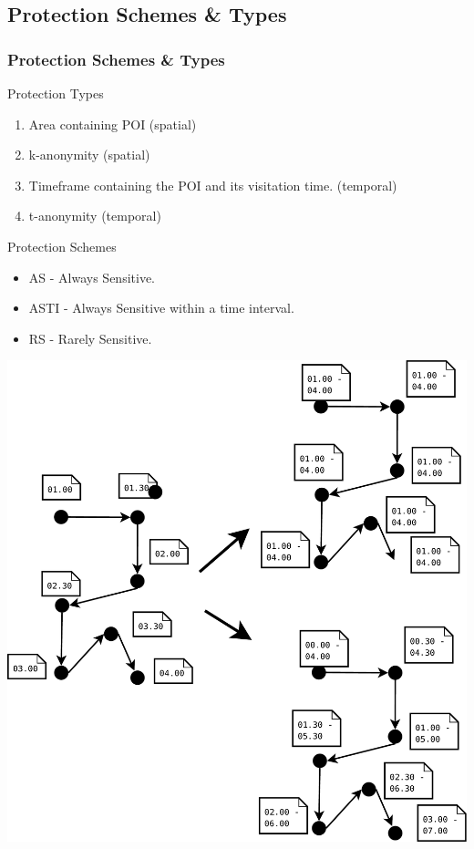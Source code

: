 \subsection{Protection Schemes \& Types} %
\begin{frame}[red] %
\frametitle{Protection Schemes \& Types}

Protection Types
\begin{enumerate}
	\item Area containing POI (spatial)
	\item k-anonymity (spatial)
	\item Timeframe containing the POI and its visitation time. (temporal)
	\item t-anonymity (temporal)
\end{enumerate}

\vspace{1em}

Protection Schemes
\begin{itemize}
	\item AS - Always Sensitive.
	\item ASTI - Always Sensitive within a time interval.
	\item RS - Rarely Sensitive.
\end{itemize}

\end{frame}

% 


\begin{frame}[red]
\includegraphics[page=1,scale=0.22]{images/traTime.pdf}
\end{frame}



